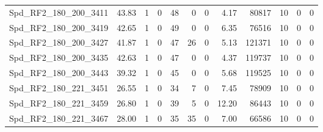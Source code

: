 \begin{longtable}[c]{@{}lrrrrrrrrrrr@{}}
Spd\_RF2\_180\_200\_3411     & 43.83                  & 1                       & 0                       & 48                     & 0                       & 0                       & 4.17                    & 80817                    & 10                       & 0                        & 0                        \\
Spd\_RF2\_180\_200\_3419     & 42.65                  & 1                       & 0                       & 49                     & 0                       & 0                       & 6.35                    & 76516                    & 10                       & 0                        & 0                        \\
Spd\_RF2\_180\_200\_3427     & 41.87                  & 1                       & 0                       & 47                     & 26                      & 0                       & 5.13                    & 121371                   & 10                       & 0                        & 0                        \\
Spd\_RF2\_180\_200\_3435     & 42.63                  & 1                       & 0                       & 47                     & 0                       & 0                       & 4.37                    & 119737                   & 10                       & 0                        & 0                        \\
Spd\_RF2\_180\_200\_3443     & 39.32                  & 1                       & 0                       & 45                     & 0                       & 0                       & 5.68                    & 119525                   & 10                       & 0                        & 0                        \\
Spd\_RF2\_180\_221\_3451     & 26.55                  & 1                       & 0                       & 34                     & 7                       & 0                       & 7.45                    & 78909                    & 10                       & 0                        & 0                        \\
Spd\_RF2\_180\_221\_3459     & 26.80                  & 1                       & 0                       & 39                     & 5                       & 0                       & 12.20                   & 86443                    & 10                       & 0                        & 0                        \\
Spd\_RF2\_180\_221\_3467     & 28.00                  & 1                       & 0                       & 35                     & 35                      & 0                       & 7.00                    & 66586                    & 10                       & 0                        & 0                        \\

\end{longtable}
